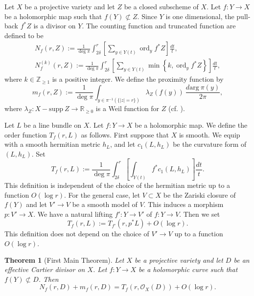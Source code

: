 \documentclass[11pt,english]{smfart}
\theoremstyle{plain}
\newtheorem{thm}{Theorem}[section]
\theoremstyle{definition}
\theoremstyle{remark}
\numberwithin{equation}{section}
\theoremstyle{plain}
\begin{document}
	
	Let $X$ be a projective variety and let $Z$ be a closed subscheme of $X$. Let $f: Y \rightarrow X$ be a holomorphic map such that $f(Y)\not\subset Z$. 
	Since $Y$ is one dimensional, the pull-back $f^{*} Z$ is a divisor on $Y$. The counting function and truncated function are defined to be 
	$$
	\begin{gathered}
		N_f(r, Z):=\frac{1}{\operatorname{deg}  \pi} \int_{2\delta}^{r}\left[\sum_{y \in Y(t)} \operatorname{ord}_{y} f^{*} Z\right] \frac{d t}{t}, \\
		{N}_f^{(k)}(r, Z):=\frac{1}{\operatorname{deg} \pi} \int_{2\delta}^{r}\left[\sum_{y \in Y(t)} \min \left\{k, \operatorname{ord}_{y} f^{*} Z\right\}\right] \frac{d t}{t} ,
	\end{gathered}
	$$
	where $k\in\mathbb Z_{\geq 1}$ is a positive integer.
	We define the proximity function by
	$$
	m_f(r, Z):=\frac{1}{\operatorname{deg} \pi} \int_{y\in \pi^{-1}(\{|z|=r\})}\lambda_Z(f(y))\ \frac{d\mathrm{arg}\ \pi(y)}{2\pi},
	$$
	where $\lambda_Z:X-\mathrm{supp}\ Z\to \mathbb R_{\geq 0}$ is a Weil function for $Z$ (cf. \cite[Prop 2.2.3]{Yam04}).
	
	
	Let $L$ be a line bundle on $X$.
	Let $f:Y\to X$ be a holomorphic map.
	We define the order function $T_f(r,L)$ as follows.
	First suppose that $X$ is smooth.
	We equip with a smooth hermitian metric $h_L$, and let $c_1(L,h_L)$ be the curvature form of $(L, h_L)$.  Set
	$$
	T_f(r,L):=\frac{1}{\operatorname{deg} \pi} \int_{2\delta}^{r}\left[\int_{Y(t)} f^{*}c_1(L,h_L)\right] \frac{d t}{t}.
	$$
	This definition is independent of the choice of  the hermitian metric up to a function  $O(\log r)$.  
	For the general case, let $V\subset X$ be the Zariski closure of $f(Y)$ and let $V'\to V$ be a smooth model of $V$.
	This induces a morphism $p:V'\to X$. 
	We have a natural lifting $f':Y\to V'$ of $f:Y\to V$.
	Then we set
	$$
	T_f(r,L):=T_{f'}(r,p^*L)+O(\log r).
	$$
	This definition does not depend on the choice of $V'\to V$ up to a function  $O(\log r)$.
	
	
	\begin{thm}[First Main Theorem]\label{thm:first}
		Let $X$ be a projective variety and let $D$ be an effective Cartier divisor on $X$.
		Let $f:Y\to X$ be a holomorphic curve such that $f(Y)\not\subset D$.
		Then
		$$N_f(r,D)+m_f(r,D)=T_f(r,\mathcal{O}_X(D))+O(\log r).$$
	\end{thm}
	
\end{document}
